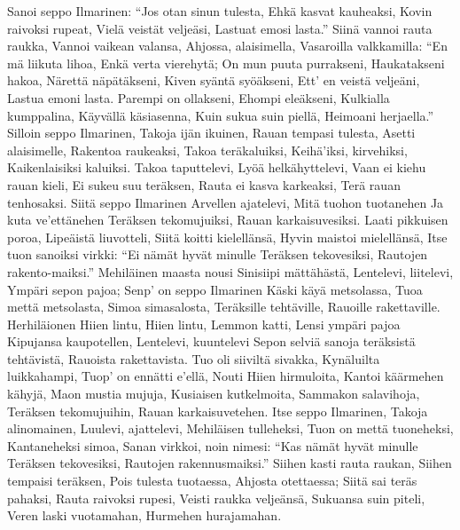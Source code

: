   \endverse
  \beginverse
    Sanoi seppo Ilmarinen:
    ``Jos otan sinun tulesta,
    Ehkä kasvat kauheaksi,
    Kovin raivoksi rupeat,
    Vielä veistät veljeäsi,
    Lastuat emosi lasta.''
  \endverse
  \beginverse
    Siinä vannoi rauta raukka,
    Vannoi vaikean valansa,
    Ahjossa, alaisimella,
    Vasaroilla valkkamilla:
    ``En mä liikuta lihoa,
    Enkä verta vierehytä;
    On mun puuta purrakseni,
    Haukatakseni hakoa,
    Närettä näpätäkseni,
    Kiven syäntä syöäkseni,
    Ett' en veistä veljeäni,
    Lastua emoni lasta.
    Parempi on ollakseni,
    Ehompi eleäkseni,
    Kulkialla kumppalina,
    Käyvällä käsiasenna,
    Kuin sukua suin piellä,
    Heimoani herjaella.''
  \endverse
  \beginverse
    Silloin seppo Ilmarinen,
    Takoja ijän ikuinen,
    Rauan tempasi tulesta,
    Asetti alaisimelle,
    Rakentoa raukeaksi,
    Takoa teräkaluiksi,
    Keihä'iksi, kirvehiksi,
    Kaikenlaisiksi kaluiksi.
    Takoa taputtelevi,
    Lyöä helkähyttelevi,
    Vaan ei kiehu rauan kieli,
    Ei sukeu suu teräksen,
    Rauta ei kasva karkeaksi,
    Terä rauan tenhosaksi.
  \endverse
  \beginverse
    Siitä seppo Ilmarinen
    Arvellen ajatelevi,
    Mitä tuohon tuotanehen
    Ja kuta ve'ettänehen
    Teräksen tekomujuiksi,
    Rauan karkaisuvesiksi.
    Laati pikkuisen poroa,
    Lipeäistä liuvotteli,
    Siitä koitti kielellänsä,
    Hyvin maistoi mielellänsä,
    Itse tuon sanoiksi virkki:
    ``Ei nämät hyvät minulle
    Teräksen tekovesiksi,
    Rautojen rakento-maiksi.''
  \endverse
  \beginverse
    Mehiläinen maasta nousi
    Sinisiipi mättähästä,
    Lentelevi, liitelevi,
    Ympäri sepon pajoa;
    Senp' on seppo Ilmarinen
    Käski käyä metsolassa,
    Tuoa mettä metsolasta,
    Simoa simasalosta,
    Teräksille tehtäville,
    Rauoille rakettaville.
  \endverse
  \beginverse
    Herhiläionen Hiien lintu,
    Hiien lintu, Lemmon katti,
    Lensi ympäri pajoa
    Kipujansa kaupotellen,
    Lentelevi, kuuntelevi
    Sepon selviä sanoja
    teräksistä tehtävistä,
    Rauoista rakettavista.
  \endverse
  \beginverse
    Tuo oli siiviltä sivakka,
    Kynäluilta luikkahampi,
    Tuop' on ennätti e'ellä,
    Nouti Hiien hirmuloita,
    Kantoi käärmehen kähyjä,
    Maon mustia mujuja,
    Kusiaisen kutkelmoita,
    Sammakon salavihoja,
    Teräksen tekomujuihin,
    Rauan karkaisuvetehen.
  \endverse
  \beginverse
    Itse seppo Ilmarinen,
    Takoja alinomainen,
    Luulevi, ajattelevi,
    Mehiläisen tulleheksi,
    Tuon on mettä tuoneheksi,
    Kantaneheksi simoa,
    Sanan virkkoi, noin nimesi:
    ``Kas nämät hyvät minulle
    Teräksen tekovesiksi,
    Rautojen rakennusmaiksi.''
    Siihen kasti rauta raukan,
    Siihen tempaisi teräksen,
    Pois tulesta tuotaessa,
    Ahjosta otettaessa;
    Siitä sai teräs pahaksi,
    Rauta raivoksi rupesi,
    Veisti raukka veljeänsä,
    Sukuansa suin piteli,
    Veren laski vuotamahan,
    Hurmehen hurajamahan.
  \endverse
\endsong


